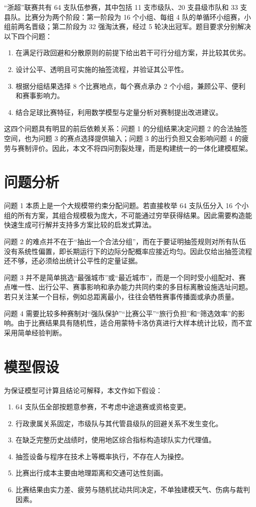 \documentclass[UTF8,a4paper,12pt]{ctexart}
\begin{document}
“浙超”联赛共有 64 支队伍参赛，其中包括 11 支市级队、20 支县级市队和 33 支县队。比赛分为两个阶段：第一阶段为 16 个小组、每组 4 队的单循环小组赛，小组前两名晋级；第二阶段为 32 强淘汰赛，经过 5 轮决出冠军。题目要求分别解决以下四个问题：

\begin{enumerate}
  \item 在满足行政回避和分散原则的前提下给出若干可行分组方案，并比较其优劣。
  \item 设计公平、透明且可实施的抽签流程，并验证其公平性。
  \item 根据分组结果选择 8 个比赛地点，每个赛点承办 2 个小组，兼顾公平、便利和赛事影响力。
  \item 结合足球比赛特征，利用数学模型与定量分析对赛制提出改进建议。
\end{enumerate}

这四个问题具有明显的前后依赖关系：问题 1 的分组结果决定问题 2 的合法抽签空间，也为问题 3 的赛点选择提供输入；问题 3 的出行负担又会影响问题 4 的疲劳与赛制评价。因此，本文不将四问割裂处理，而是构建统一的一体化建模框架。

\section{问题分析}

问题 1 本质上是一个大规模带约束分配问题。若直接枚举 64 支队伍分入 16 个小组的所有方案，其组合规模极为庞大，不可能通过穷举获得结果。因此需要构造能快速生成可行解并支持多方案比较的启发式算法。

问题 2 的难点并不在于“抽出一个合法分组”，而在于要证明抽签规则对所有队伍没有系统性偏置，即长期运行下的边际分配概率应接近均匀。因此仅给出抽签流程还不够，还必须给出统计公平性的定量证据。

问题 3 并不是简单挑选“最强城市”或“最近城市”，而是一个同时受小组配对、赛点唯一性、出行公平、赛事影响和承办能力共同约束的多目标离散设施选址问题。若只关注某一个目标，例如总距离最小，往往会牺牲赛事传播面或承办质量。

问题 4 需要比较多种赛制对“强队保护”“比赛公平”“旅行负担”和“筛选效率”的影响。由于比赛结果具有随机性，适合用蒙特卡洛仿真进行大样本统计比较，而不宜采用简单经验判断。

\section{模型假设}

为保证模型可计算且结论可解释，本文作如下假设：

\begin{enumerate}
  \item 64 支队伍全部按题意参赛，不考虑中途退赛或资格变更。
  \item 行政隶属关系固定，市级队与其代管县级队的回避关系不发生变化。
  \item 在缺乏完整历史战绩时，使用地区综合指标构造球队实力代理值。
  \item 抽签设备与程序在技术上等概率执行，不存在人为操控。
  \item 比赛出行成本主要由地理距离和交通可达性刻画。
  \item 比赛结果由实力差、疲劳与随机扰动共同决定，不单独建模天气、伤病与裁判因素。
\end{enumerate}
\end{document}
